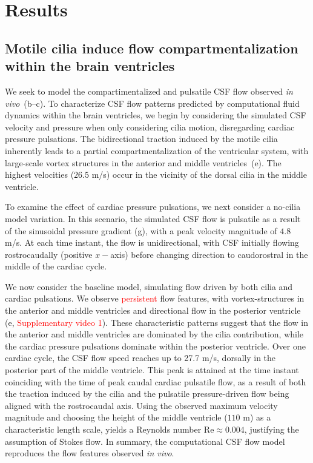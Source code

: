 \documentclass[fleqn]{wlscirep}
\newcommand{\fixme}[1]{\textcolor{red}{#1}}
\begin{document}
\section*{Results}

\subsection*{Motile cilia induce flow compartmentalization within the brain ventricles}

We seek to model the compartimentalized and pulsatile CSF flow observed \emph{in vivo}~(b--c).
To characterize CSF flow patterns predicted by
computational fluid dynamics within the brain ventricles, we begin by
considering the simulated CSF velocity and pressure when only considering
cilia motion, disregarding cardiac pressure pulsations. The
bidirectional traction induced by the motile cilia
inherently leads to a partial compartmentalization of the ventricular
system, with large-scale vortex structures in the anterior and middle
ventricles~(e). The highest velocities ($26.5$ \textmu m/s)
occur in the vicinity of the dorsal cilia in the middle ventricle. 

To examine the effect of cardiac pressure pulsations,
we next consider a no-cilia model variation. In this scenario, the simulated CSF
flow is pulsatile as a result of the sinusoidal pressure gradient (g),
with a peak velocity magnitude of $4.8$ \textmu m/s. At each time instant, the flow
is unidirectional, with CSF initially flowing rostrocaudally (positive $x-$axis) before changing
direction to caudorostral in the middle of the cardiac cycle.

We now consider the baseline model, simulating flow driven by both cilia
and cardiac pulsations. We observe \fixme{persistent} flow features,
with vortex-structures in the anterior and middle ventricles
and directional flow in the posterior ventricle (e,
\fixme{Supplementary video 1}). These characteristic patterns suggest
that the flow in the anterior and middle ventricles are dominated by
the cilia contribution, while the cardiac pressure pulsations dominate
within the posterior ventricle. Over one cardiac cycle, the CSF flow
speed reaches up to 27.7 \textmu m/s, dorsally in the posterior part
of the middle ventricle. This peak is attained at the time instant
coinciding with the time of peak caudal cardiac pulsatile flow, as a
result of both the traction induced by the cilia and the pulsatile
pressure-driven flow being aligned with the rostrocaudal 
axis. Using the observed maximum velocity magnitude and choosing the height of
the middle ventricle ($110$ \textmu m) as a characteristic length
scale, yields a Reynolds number $\mathrm{Re} \approx 0.004$,
justifying the assumption of Stokes flow. In summary, the computational
CSF flow model reproduces the flow features observed \emph{in vivo}.
\end{document}

